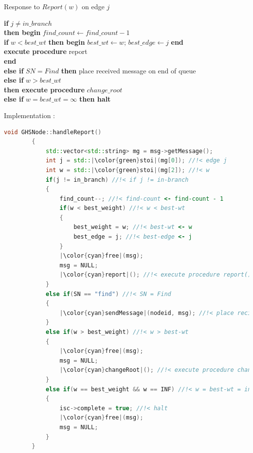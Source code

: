 \documentclass[letterpaper,11pt]{article}
\begin{document}
	\begin{tcolorbox}
		Response to $Report(w)$ on edge $j$
		\begin{algorithmic}
			\STATE \textbf{if} $j \neq in\_branch$ \\
			{\quad \quad \bf then begin} $find\_count \leftarrow find\_count - 1$ \\
			{\qquad \qquad \qquad \bf if} $w < best\_wt$ {\bf then begin} $best\_wt \leftarrow w$; $best\_edge \leftarrow j$ {\bf end}\\
			{\qquad \qquad \qquad \bf execute procedure} report \\
			{\qquad \qquad \bf end} \\
			{\quad \quad \bf else if} $SN = Find$ {\bf then} place  received message on end of queue \\
			{\qquad \qquad \quad \bf else if} $w > best\_wt$ \\
			{\qquad \qquad \qquad \quad \bf then execute procedure } $change\_root$\\
			{\qquad \qquad \qquad \quad \bf else if } $w = best\_wt = \infty$ {\bf then halt} \\
		\end{algorithmic}
	\end{tcolorbox}
	
	\bigskip 
	
	Implementation : 
	
	
	\begin{lstlisting}[language=C++, caption= handleReport()]
		void GHSNode::handleReport()
		{
			std::vector<std::string> mg = msg->getMessage();
			int j = std::|\color{green}stoi|(mg[0]); //!< edge j
			int w = std::|\color{green}stoi|(mg[2]); //!< w
			if(j != in_branch) //!< if j != in-branch
			{
				find_count--; //!< find-count <- find-count - 1
				if(w < best_weight) //!< w < best-wt
				{
					best_weight = w; //!< best-wt <- w
					best_edge = j; //!< best-edge <- j
				}
				|\color{cyan}free|(msg);
				msg = NULL;
				|\color{cyan}report|(); //!< execute procedure report()
			}
			else if(SN == "find") //!< SN = Find
			{
				|\color{cyan}sendMessage|(nodeid, msg); //!< place recieved message on end of queue
			}
			else if(w > best_weight) //!< w > best-wt
			{
				|\color{cyan}free|(msg);
				msg = NULL;
				|\color{cyan}changeRoot|(); //!< execute procedure change-root()
			}
			else if(w == best_weight && w == INF) //!< w = best-wt = infinity 
			{
				isc->complete = true; //!< halt
				|\color{cyan}free|(msg);
				msg = NULL;
			}
		}
	\end{lstlisting}
	
\end{document}
